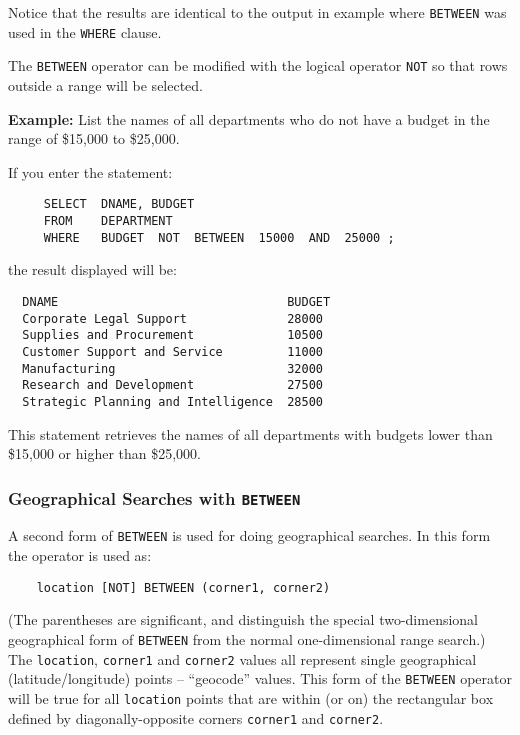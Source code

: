 Notice that the results are identical to the output in example where
{\tt BETWEEN} was used in the \verb`WHERE` clause.

The {\tt BETWEEN} operator can be modified with the logical operator {\tt NOT} so
that rows outside a range will be selected.

{\bf Example:}
List the names of all departments who do not have a budget in the
range of \$15,000 to \$25,000.

If you enter the statement:
\begin{verbatim}
     SELECT  DNAME, BUDGET
     FROM    DEPARTMENT
     WHERE   BUDGET  NOT  BETWEEN  15000  AND  25000 ;
\end{verbatim}
the result displayed will be:

\begin{screen}
\begin{verbatim}
  DNAME                                BUDGET
  Corporate Legal Support              28000
  Supplies and Procurement             10500
  Customer Support and Service         11000
  Manufacturing                        32000
  Research and Development             27500
  Strategic Planning and Intelligence  28500
\end{verbatim}
\end{screen}

This statement retrieves the names of all departments with budgets
lower than \$15,000 or higher than \$25,000.

\subsubsection{Geographical Searches with {\tt BETWEEN}}

A second form of \verb`BETWEEN` is used for doing geographical searches.
In this form the operator is used as:

\begin{verbatim}
    location [NOT] BETWEEN (corner1, corner2)
\end{verbatim}

(The parentheses are significant, and distinguish the special
two-dimensional geographical form of \verb`BETWEEN` from the normal
one-dimensional range search.)  The \verb`location`, \verb`corner1`
and \verb`corner2` values all represent single geographical
(latitude/longitude) points -- ``geocode'' values.  This form of the
\verb`BETWEEN` operator will be true for all \verb`location` points
that are within (or on) the rectangular box defined by
diagonally-opposite corners \verb`corner1` and \verb`corner2`.

